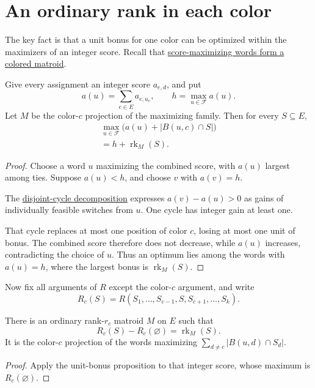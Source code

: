 \section[matroidRankSlices]{An ordinary rank in each color}

The key fact is that a unit bonus for one color can be optimized within
the maximizers of an integer score. Recall that
\href{operations.htm#scoreMaximizers}{score-maximizing words form a
colored matroid}.

\begin{proposition}
Give every assignment an integer score $a_{e,d}$, and put
\[
 a(u)=\sum_{e\in E}a_{e,u_e},\qquad
 h=\max_{u\in\mathcal F}a(u).
\]
Let $M$ be the color-$c$ projection of the maximizing family. Then
for every $S\subseteq E$,
\[
 \begin{gathered}
 \max_{u\in\mathcal F}\bigl(a(u)+|B(u,c)\cap S|\bigr)\\
 =h+\operatorname{rk}_M(S).
 \end{gathered}
\]
\end{proposition}

\begin{proof}
Choose a word $u$ maximizing the combined score, with $a(u)$ largest
among ties. Suppose $a(u)<h$, and choose $v$ with $a(v)=h$.

The \href{exchange-graphs.htm#disjointCycles}{disjoint-cycle decomposition}
expresses $a(v)-a(u)>0$ as gains of individually feasible switches
from $u$. One cycle has integer gain at least one.

That cycle replaces at most one position of color $c$, losing at most
one unit of bonus. The combined score therefore does not decrease,
while $a(u)$ increases, contradicting the choice of $u$.
Thus an optimum lies among the words with $a(u)=h$, where the largest
bonus is $\operatorname{rk}_M(S)$.
\end{proof}

Now fix all arguments of $R$ except the color-$c$ argument, and write
\[
 R_c(S)=R(S_1,\dotsc,S_{c-1},S,S_{c+1},\dotsc,S_k).
\]

\begin{theorem}
There is an ordinary rank-$r_c$ matroid $M$ on $E$ such that
\[
 R_c(S)-R_c(\varnothing)=\operatorname{rk}_M(S).
\]
It is the color-$c$ projection of the words maximizing
$\sum_{d\ne c}|B(u,d)\cap S_d|$.
\end{theorem}

\begin{proof}
Apply the unit-bonus proposition to that integer score, whose maximum
is $R_c(\varnothing)$.
\end{proof}

